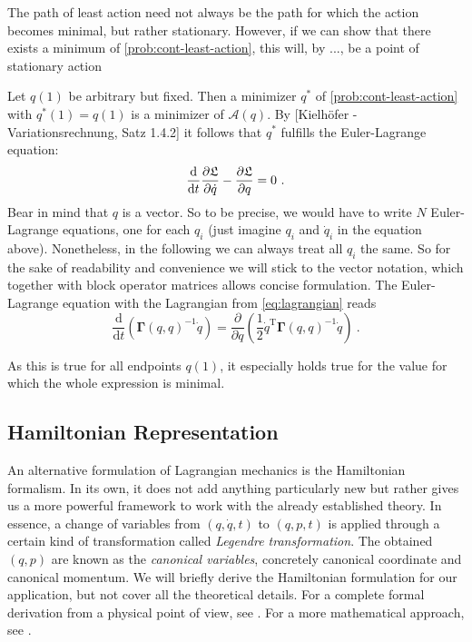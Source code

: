 The path of least action need not always be the path for which the action becomes minimal, but rather stationary.
However, if we can show that there exists a minimum of \cref{prob:cont-least-action}, this will, by ..., be a point of stationary action

Let $q(1)$ be arbitrary but fixed.
Then a minimizer $q^\ast$ of \cref{prob:cont-least-action} with $q^\ast(1) = q(1)$ is a minimizer of $\mathcal{A}(q)$.
By [Kielhöfer - Variationsrechnung, Satz 1.4.2] it follows that $q^\ast$ fulfills the Euler-Lagrange equation:
\begin{equation}
	\frac{\mathrm{d}}{\mathrm{d}t} \frac{\partial \fL}{\partial \dot{q}} - \frac{\partial \fL}{\partial q} = 0 \ .
\end{equation}
Bear in mind that $q$ is a vector.
So to be precise, we would have to write $N$ Euler-Lagrange equations, one for each $q_i$ (just imagine $q_i$ and $\dot{q}_i$ in the equation above).
Nonetheless, in the following we can always treat all $q_i$ the same.
So for the sake of readability and convenience we will stick to the vector notation, which together with block operator matrices allows concise formulation.
The Euler-Lagrange equation with the Lagrangian from \cref{eq:lagrangian} reads
\begin{equation}
\label{eq:concrete-lagrangian}
	\frac{\mathrm{d}}{\mathrm{d}t} \left(\mathbf{\Gamma}(q, q)^{-1} \dot{q} \right)
	= \frac{\partial}{\partial q} \left(\frac{1}{2} \dot{q}^\mathrm{T} \mathbf{\Gamma}(q, q)^{-1} \dot{q}\right) \ .
\end{equation}

As this is true for all endpoints $q(1)$, it especially holds true for the value for which the whole expression is minimal.

\subsection{Hamiltonian Representation}

An alternative formulation of Lagrangian mechanics is the Hamiltonian formalism.
In its own, it does not add anything particularly new but rather gives us a more powerful framework to work with the already established theory.
In essence, a change of variables from $(q, \dot{q}, t)$ to $(q, p, t)$ is applied through a certain kind of transformation called \emph{Legendre transformation}.
The obtained $(q, p)$ are known as the \emph{canonical variables}, concretely canonical coordinate and canonical momentum.
We will briefly derive the Hamiltonian formulation for our application, but not cover all the theoretical details.
For a complete formal derivation from a physical point of view, see \cite[Chapter~8]{goldstein01}.
For a more mathematical approach, see \cite[Chapter~2]{marsden10}.


